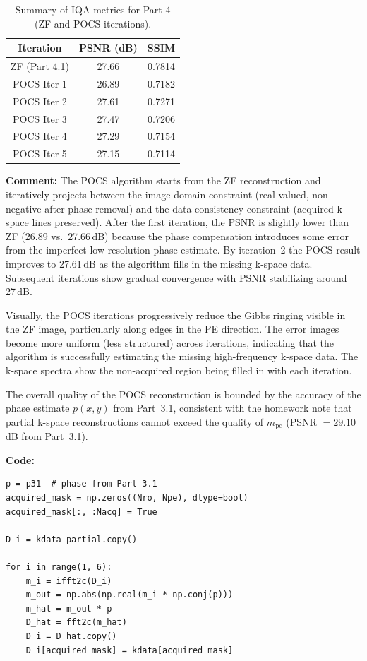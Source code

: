 \documentclass[12pt]{article}
\begin{document}
\begin{table}[H]
\centering
\begin{tabular}{|c|c|c|}
\hline
\textbf{Iteration} & \textbf{PSNR (dB)} & \textbf{SSIM} \\
\hline
ZF (Part 4.1) & 27.66 & 0.7814 \\
POCS Iter 1 & 26.89 & 0.7182 \\
POCS Iter 2 & 27.61 & 0.7271 \\
POCS Iter 3 & 27.47 & 0.7206 \\
POCS Iter 4 & 27.29 & 0.7154 \\
POCS Iter 5 & 27.15 & 0.7114 \\
\hline
\end{tabular}
\caption{Summary of IQA metrics for Part 4 (ZF and POCS iterations).}
\label{tab:p4_iqa}
\end{table}

\textbf{Comment:} The POCS algorithm starts from the ZF reconstruction and iteratively projects between the image-domain constraint (real-valued, non-negative after phase removal) and the data-consistency constraint (acquired k-space lines preserved). After the first iteration, the PSNR is slightly lower than ZF (26.89 vs.\ 27.66\,dB) because the phase compensation introduces some error from the imperfect low-resolution phase estimate. By iteration~2 the POCS result improves to 27.61\,dB as the algorithm fills in the missing k-space data. Subsequent iterations show gradual convergence with PSNR stabilizing around 27\,dB.

Visually, the POCS iterations progressively reduce the Gibbs ringing visible in the ZF image, particularly along edges in the PE direction. The error images become more uniform (less structured) across iterations, indicating that the algorithm is successfully estimating the missing high-frequency k-space data. The k-space spectra show the non-acquired region being filled in with each iteration.

The overall quality of the POCS reconstruction is bounded by the accuracy of the phase estimate $p(x,y)$ from Part~3.1, consistent with the homework note that partial k-space reconstructions cannot exceed the quality of $m_\text{pc}$ (PSNR $= 29.10$\,dB from Part~3.1).

\textbf{Code:}
\begin{lstlisting}
p = p31  # phase from Part 3.1
acquired_mask = np.zeros((Nro, Npe), dtype=bool)
acquired_mask[:, :Nacq] = True

D_i = kdata_partial.copy()

for i in range(1, 6):
    m_i = ifft2c(D_i)
    m_out = np.abs(np.real(m_i * np.conj(p)))
    m_hat = m_out * p
    D_hat = fft2c(m_hat)
    D_i = D_hat.copy()
    D_i[acquired_mask] = kdata[acquired_mask]
\end{lstlisting}
\end{document}
